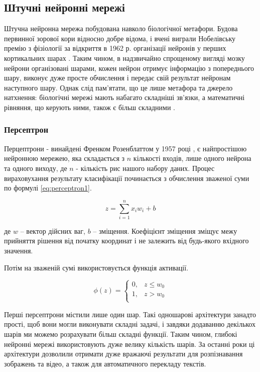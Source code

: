 \documentclass[a4paper,14pt]{extreport}
\begin{document}
\subsection{Штучні нейронні мережі}
Штучна нейронна мережа побудована навколо біологічної метафори.
Будова первинної зорової кори відносно добре відома,
і вчені виграли Нобелівську премію з фізіології за відкриття в
1962 р. організації нейронів у перших кортикальних
шарах \cite{cortex-stuff}. Таким чином, в надзвичайно
спрощеному вигляді
мозку нейрони організовані шарами, кожен нейрон отримує
інформацію з попереднього шару, виконує дуже просте
обчислення і передає свій результат нейронам наступного
шару. Однак слід пам’ятати, що це лише метафора та джерело
натхнення: біологічні мережі мають набагато складніші
зв’язки, а математичні рівняння, що керують ними, також
є більш складними \cite{cortex-equations}.

\subsubsection{Персептрон}
Перцептрони - винайдені Френком Розенблаттом у 1957 році
\cite{rozenblatt}, є найпростішою
нейронною мережею, яка складається з $n$ кількості входів, лише одного
нейрона та одного виходу, де $n$ - кількість рис нашого набору
даних. Процес вираховухання результату класифікації починається
з обчислення зваженої суми
по формулі \ref{eq:perceptron1}.

\begin{equation}
    z = \sum^n_{i=1} x_i w_i + b
    \label{eq:perceptron1}
\end{equation}

де $w$ -- вектор дійсних ваг, $b$ -- зміщення.
Коефіцієнт зміщення зміщує межу прийняття рішення
від початку координат і не залежить від будь-якого
вхідного значення.

Потім на зваженій сумі використовується функція активації.

\begin{equation}
    \phi(z) = \begin{cases}
        0 ,& z \le w_0 \\
        1 ,& z > w_0 \\
    \end{cases}
    \label{eq:perceptron2}
\end{equation}

Перші персептрони містили лише один шар. Такі одношарові
архітектури занадто прості, щоб вони могли виконувати складні задачі,
і завдяки додаванню декількох шарів ми можемо розрахувати більш складні
функції. Таким чином, глибокі нейронні мережі використовують дуже
велику кількість шарів. За останні роки ці архітектури дозволили
отримати дуже вражаючі результати для розпізнавання зображень та
відео, а також для автоматичного перекладу текстів.
\end{document}
